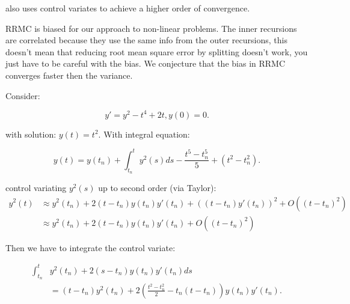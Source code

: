 \documentclass[a4paper,12pt]{article}
\begin{document}
\begin{related}[CV RRMC]
    \cite{daun_randomized_2011} also uses control variates to achieve
    a higher order of convergence.
\end{related}

RRMC is biased for our approach to non-linear problems.
The inner recursions are correlated because they use the same
info from the outer recursions, this doesn't mean that reducing
root mean square error by splitting doesn't work, you just have to be careful
with the bias. We conjecture that the bias in RRMC converges faster then the
variance.


\begin{example} \label{ex:nonlinear RRMC IVP}
    Consider:

    \begin{equation}
        y' = y^{2} - t^{4} +2t,y(0)=0.
    \end{equation}

    with solution: $y(t)=t^{2}$. With integral equation:

    \begin{equation}
        y(t)= y(t_{n}) + \int_{t_{n}}^{t} y^{2}(s) ds
        - \frac{t^{5}-t_{n}^{5}}{5} +(t^{2}-t_{n}^{2}) .
    \end{equation}

    control variating $y^{2}(s)$ up to second order (via Taylor):
    \begin{align}
        y^{2}(t) & \approx y^{2}(t_{n}) + 2(t-t_{n})y(t_{n})y'(t_{n})
        + ((t-t_{n})y'(t_{n}))^{2} + O((t-t_{n})^{2})                                   \\
                 & \approx y^{2}(t_{n}) + 2(t-t_{n})y(t_{n})y'(t_{n})+ O((t-t_{n})^{2})
    \end{align}

    Then we have to integrate the control variate:

    \begin{align}
        \int_{t_{n}}^{t} & y^{2}(t_{n}) + 2(s-t_{n})y(t_{n})y'(t_{n}) ds \\
                         & = (t-t_{n})y^{2}(t_{n})+
        2\left(\frac{t^{2}-t_{n}^{2}}{2} -t_{n}(t-t_{n}) \right)y(t_{n})y'(t_{n}).
    \end{align}

\end{example}

\begin{pythonn} \label{py:nonlinear RRMC IVP}
\end{pythonn}
\end{document}
